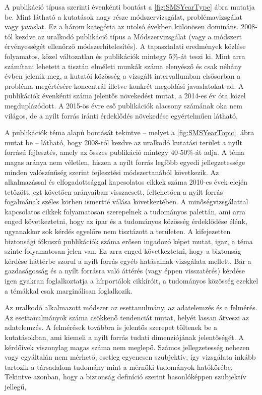 \documentclass[12pt,magyar,a4paper,oneside]{scrreprt}
\begin{document}
A publikáció típusa szerinti évenkénti bontást a \ref{fig:SMSYearType}
ábra mutatja be. Mint látható a kutatások nagy része módszervizsgálat,
problémavizsgálat vagy javaslat. Ez a három kategória az utolsó években
különösen domináns. 2008-tól kezdve az uralkodó publikáció típus a
Módszervizsgálat (vagy a módszert érvényességét ellenőrző
módszerhitelesítés). A tapasztalati eredmények közlése folyamatos, közel
változatlan és publikációk mintegy 5\%-át teszi ki. Mint arra számítani
lehetett a tisztán elméleti munkák száma elenyésző és csak néhány évben
jelenik meg, a kutatói közösség a vizsgált intervallumban elsősorban a
probléma megértésére koncentrál illetve konkrét megoldási javaslatokat
ad. A publikációk évenkénti száma jelentős növekedést mutat, a 2014-es
év óta közel megduplázódott. A 2015-ös évre eső publikációk alacsony
számának oka nem világos, de a nyílt forrás iránti érdeklődés növekedése
egyértelműen látható.

A publikációk téma alapú bontását tekintve -- melyet a
\ref{fig:SMSYearTopic}. ábra mutat be -- látható, hogy 2008-tól kezdve
az uralkodó kutatási terület a nyílt forrású fejlesztés, amely az összes
publikáció mintegy 40-50\%-át adja. A téma magas aránya nem véletlen,
hiszen a nyílt forrás legfőbb egyedi jellegzetessége minden valószínűség
szerint fejlesztési módszertanából következik. Az alkalmazással és
elfogadottsággal kapcsolatos cikkek száma 2010-es évek elején tetőzött,
ezt követően arányaiban visszaesett, feltehetően a nyílt forrás
fogalmának széles körben ismertté válása következtében. A
minőségvizsgálattal kapcsolatos cikkek folyamatosan szerepelnek a
tudományos palettán, ami arra enged következtetni, hogy az ipar és a
tudományos közösség érdeklődése élénk, ugyanakkor sok kérdés egyelőre
nem tisztázott a területen. A kifejezetten biztonsági fókuszú
publikációk száma erősen ingadozó képet mutat, igaz, a téma szinte
folyamatosan jelen van. Ez arra enged következtetni, hogy a biztonság
kérdése háttérbe szorul a nyílt forrás egyéb hatásainak vizsgálata
mellett. Bár a gazdaságosság és a nyílt forrásra való áttérés (vagy
éppen visszatérés) kérdése igen gyakran foglalkoztatja a hírportálok
cikkíróit, a tudományos közösség ezekkel a témákkal csak marginálisan
foglalkozik.

Az uralkodó alkalmazott módszer az esettanulmány, az adatelemzés és a
felmérés. Az esettanulmányok száma csökkenő tendenciát mutat, helyét
lassan átveszi az adatelemzés. A felmérések továbbra is jelentős
szerepet töltenek be a kutatásokban, ami kiemeli a nyílt forrás tudati
dimenziójának jelentőségét. A kérdőívek viszonylag magas száma nem
meglepő. Számos jellegzetesség nehezen vagy egyáltalán nem mérhető,
esetleg egyenesen szubjektív, így vizsgálata inkább tartozik a
társadalom-tudomány mint a mérnöki tudományok hatókörébe. Tekintve
azonban, hogy a biztonság definíció szerint hasonlóképpen szubjektív
jellegű,
\end{document}
